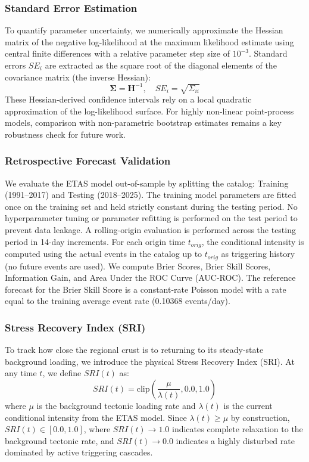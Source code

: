 \documentclass[journal]{IEEEtran}
\begin{document}
\subsubsection{Standard Error Estimation}
To quantify parameter uncertainty, we numerically approximate the Hessian matrix of the negative log-likelihood at the maximum likelihood estimate using central finite differences with a relative parameter step size of $10^{-3}$. Standard errors $SE_i$ are extracted as the square root of the diagonal elements of the covariance matrix (the inverse Hessian):
\begin{equation}
\mathbf{\Sigma} = \mathbf{H}^{-1}, \quad SE_i = \sqrt{\Sigma_{ii}}
\end{equation}
These Hessian-derived confidence intervals rely on a local quadratic approximation of the log-likelihood surface. For highly non-linear point-process models, comparison with non-parametric bootstrap estimates remains a key robustness check for future work.

\subsubsection{Retrospective Forecast Validation}
We evaluate the ETAS model out-of-sample by splitting the catalog: Training (1991–2017) and Testing (2018–2025). The training model parameters are fitted once on the training set and held strictly constant during the testing period. No hyperparameter tuning or parameter refitting is performed on the test period to prevent data leakage. A rolling-origin evaluation is performed across the testing period in 14-day increments. For each origin time $t_{orig}$, the conditional intensity is computed using the actual events in the catalog up to $t_{orig}$ as triggering history (no future events are used). We compute Brier Scores, Brier Skill Scores, Information Gain, and Area Under the ROC Curve (AUC-ROC). The reference forecast for the Brier Skill Score is a constant-rate Poisson model with a rate equal to the training average event rate (0.10368 events/day).

\subsubsection{Stress Recovery Index (SRI)}
To track how close the regional crust is to returning to its steady-state background loading, we introduce the physical Stress Recovery Index (SRI). At any time $t$, we define $SRI(t)$ as:
\begin{equation}
SRI(t) = \text{clip}\left(\frac{\mu}{\lambda(t)}, 0.0, 1.0\right)
\end{equation}
where $\mu$ is the background tectonic loading rate and $\lambda(t)$ is the current conditional intensity from the ETAS model. Since $\lambda(t) \ge \mu$ by construction, $SRI(t) \in [0.0, 1.0]$, where $SRI(t) \to 1.0$ indicates complete relaxation to the background tectonic rate, and $SRI(t) \to 0.0$ indicates a highly disturbed rate dominated by active triggering cascades.
\end{document}
